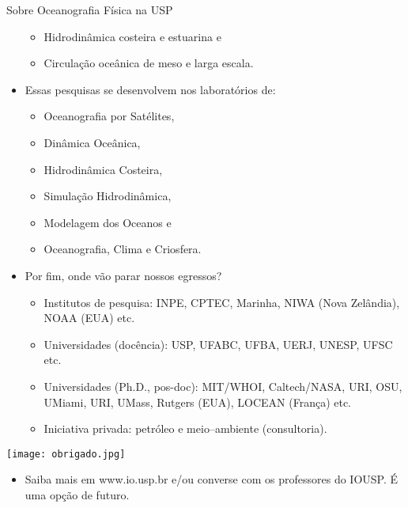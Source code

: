 \documentclass{beamer}
\begin{document}
\begin{frame}[allowframebreaks]{\normalsize Sobre Oceanografia Física na USP}
\begin{itemize}
    \begin{itemize}
    \item Hidrodinâmica costeira e estuarina e
    \item Circulação oceânica de meso e larga escala.
    \end{itemize}
  \item Essas pesquisas se desenvolvem nos laboratórios de:
    \begin{itemize}
    \item \alert{Oceanografia por Satélites},
    \item Dinâmica Oceânica,
    \item Hidrodinâmica Costeira,
    \item Simulação Hidrodinâmica,
    \item Modelagem dos Oceanos e
    \item Oceanografia, Clima e Criosfera.
    \end{itemize}
  \item Por fim, \alert{onde vão parar nossos egressos}?
    \begin{itemize}
    \item Institutos de pesquisa: INPE, CPTEC, Marinha, NIWA (Nova
      Zelândia), NOAA (EUA) etc.
    \item Universidades (docência): USP, UFABC, UFBA, UERJ, UNESP, UFSC etc.
    \item Universidades (Ph.D., pos-doc):  MIT/WHOI, Caltech/NASA, URI, OSU,
      UMiami, URI, UMass, Rutgers (EUA), LOCEAN (França) etc.
    \item Iniciativa privada: petróleo e meio--ambiente (consultoria).   
    \end{itemize}
  \end{itemize}
\end{frame}
\begin{frame}
  \centerline{\texttt{[image: obrigado.jpg]}}
  \begin{itemize}
  \item Saiba mais em \alert{www.io.usp.br} e/ou converse com os
    professores do IOUSP. É uma opção de futuro.
  \end{itemize}
\end{frame}
\end{document}
